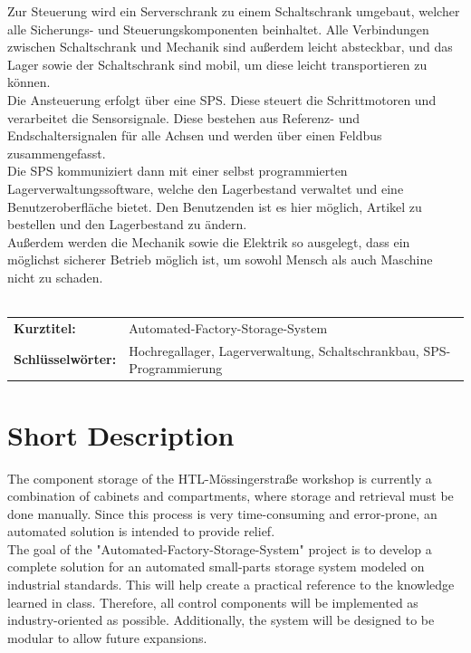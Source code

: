 \documentclass[12pt, twoside]{article}
\begin{document}
Zur Steuerung wird ein Serverschrank zu einem Schaltschrank umgebaut, welcher alle Sicherungs- und Steuerungskomponenten beinhaltet. Alle Verbindungen zwischen Schaltschrank und Mechanik sind außerdem leicht absteckbar, und das Lager sowie der Schaltschrank sind mobil, um diese leicht transportieren zu können.\\

Die Ansteuerung erfolgt über eine SPS. Diese steuert die Schrittmotoren und verarbeitet die Sensorsignale. Diese bestehen aus Referenz- und Endschaltersignalen für alle Achsen und werden über einen Feldbus zusammengefasst. \\

Die SPS kommuniziert dann mit einer selbst programmierten Lagerverwaltungssoftware, welche den Lagerbestand verwaltet und eine Benutzeroberfläche bietet. Den Benutzenden ist es hier möglich, Artikel zu bestellen und den Lagerbestand zu ändern.\\

Außerdem werden die Mechanik sowie die Elektrik so ausgelegt, dass ein möglichst sicherer Betrieb möglich ist, um sowohl Mensch als auch Maschine nicht zu schaden.
\\\\
\bgroup
    \def\arraystretch{1.5}
    \begin{tabular}{p{48mm}p{113mm}}
        \textbf{Kurztitel:} & Automated-Factory-Storage-System\\
        \textbf{Schlüsselwörter:} & Hochregallager, Lagerverwaltung, Schaltschrankbau, SPS-Programmierung
    \end{tabular}
\egroup

\newpage

\section*{Short Description}

The component storage of the HTL-Mössingerstraße workshop is currently a combination of cabinets and compartments, where storage and retrieval must be done manually. Since this process is very time-consuming and error-prone, an automated solution is intended to provide relief. \\

The goal of the "Automated-Factory-Storage-System" project is to develop a complete solution for an automated small-parts storage system modeled on industrial standards. This will help create a practical reference to the knowledge learned in class. Therefore, all control components will be implemented as industry-oriented as possible. Additionally, the system will be designed to be modular to allow future expansions.\\
\end{document}
